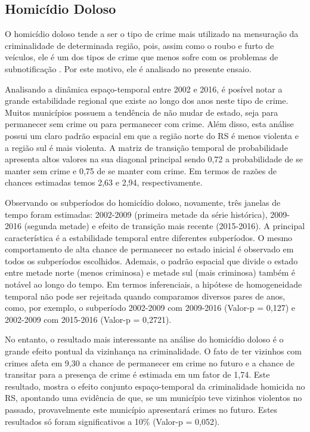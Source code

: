 \documentclass[12pt,openright,oneside,a4paper,english,french,spanish]{abntex2}
\numberwithin{table}{section} %
\numberwithin{figure}{section} %
\begin{document}
\subsection{Homicídio Doloso\label{sec:homicidio_acoplamento}}

O homicídio doloso tende a ser o tipo de crime mais utilizado na mensuração da criminalidade de determinada região, pois, assim como o roubo e furto de veículos, ele é um dos tipos de crime que menos sofre com os problemas de subnotificação \cite{cerqueira2014tese}. Por este motivo, ele é analisado no presente ensaio.

Analisando a dinâmica espaço-temporal entre 2002 e 2016, é posível notar a grande estabilidade regional que existe ao longo dos anos neste tipo de crime. Muitos municípios possuem a tendência de não mudar de estado, seja para permanecer sem crime ou para permanecer com crime. Além disso, esta análise possui um claro padrão espacial em que a região norte do RS é menos violenta e a região sul é mais violenta. A matriz de transição temporal de probabilidade apresenta altos valores na sua diagonal principal sendo 0,72 a probabilidade de se manter sem crime e 0,75 de se manter com crime. Em termos de razões de chances estimadas temos 2,63 e 2,94, respectivamente.

Observando os subperíodos do homicídio doloso, novamente, três janelas de tempo foram estimadas: 2002-2009 (primeira metade da série histórica), 2009-2016 (segunda metade) e efeito de transição mais recente (2015-2016). A principal característica é a estabilidade temporal entre diferentes subperíodos. O mesmo comportamento de alta chance de permanecer no estado inicial é observado em todos os subperíodos escolhidos. Ademais, o padrão espacial que divide o estado entre metade norte (menos criminosa) e metade sul (mais criminosa) também é notável ao longo do tempo. Em termos inferenciais, a hipótese de homogeneidade temporal não pode ser rejeitada quando comparamos diversos pares de anos, como, por exemplo, o subperíodo 2002-2009 com 2009-2016 (Valor-p = 0,127) e 2002-2009 com 2015-2016 (Valor-p = 0,2721).

No entanto, o resultado mais interessante na análise do homicídio doloso é o grande efeito pontual da vizinhança na criminalidade. O fato de ter vizinhos com crimes afeta em 9,30 a chance de permanecer em crime no futuro e a chance de transitar para a presença de crime é estimada em um fator de 1,74. Este resultado, mostra o efeito conjunto espaço-temporal da criminalidade homicida no RS, apontando uma evidência de que, se um município teve vizinhos violentos no passado, provavelmente este município apresentará crimes no futuro. Estes resultados só foram significativos a 10\% (Valor-p = 0,052).
\end{document}
